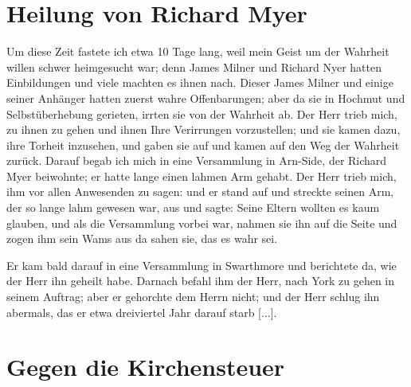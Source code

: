 \section{Heilung von Richard Myer}

Um diese Zeit fastete 
ich etwa 10 Tage lang, weil mein
Geist um der Wahrheit willen schwer heimgesucht war; denn
James Milner und Richard 
Nyer hatten Einbildungen 
und viele
machten es ihnen nach. Dieser James Milner und einige seiner
Anhänger hatten zuerst wahre 
Offenbarungen; aber da sie in
Hochmut und Selbstüberhebung gerieten, irrten sie von der
Wahrheit ab. Der Herr trieb mich, zu ihnen zu gehen und ihnen
Ihre Verirrungen vorzustellen; und sie kamen dazu, ihre Torheit
inzusehen, und gaben sie auf und kamen auf den Weg der
Wahrheit zurück. Darauf 
begab ich mich in eine Versammlung
in Arn-Side, der Richard Myer beiwohnte; 
er hatte lange einen
lahmen Arm gehabt. Der Herr trieb mich, ihm vor allen 
Anwesenden zu sagen:  und er stand auf und streckte
seinen Arm, der so lange lahm gewesen war, aus und sagte:
 Seine
Eltern wollten es kaum glauben, und als die Versammlung
vorbei war, nahmen sie ihn auf die Seite und zogen ihm sein
Wams aus da sahen sie, das es wahr sei.

Er kam bald darauf
in eine Versammlung in Swarthmore und 
berichtete da, wie
der Herr ihn geheilt habe. Darnach befahl ihm der Herr, nach
York zu gehen in seinem Auftrag; aber er gehorchte dem Herrn
nicht; und der Herr schlug ihn abermals, das er etwa dreiviertel
Jahr darauf starb [...].

\section{Gegen die Kirchensteuer}

